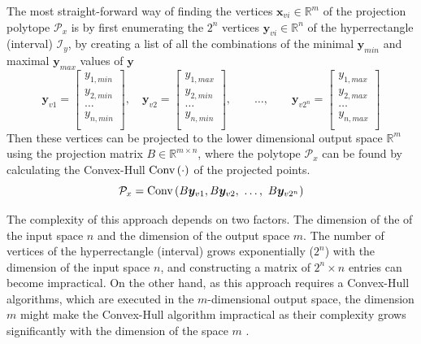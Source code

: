The most straight-forward way of finding the vertices $\bm{x}_{vi}\in\mathbb{R}^m$ of the projection polytope $\mathcal{P}_x$ is by first enumerating the $2^n$ vertices $\bm{y}_{vi}\in\mathbb{R}^n$ of the hyperrectangle  (interval) $\mathcal{I}_y$, by creating a list of all the combinations of the minimal $\bm{y}_{min}$ and maximal $\bm{y}_{max}$ values of $\bm{y}$
\begin{equation}
    \bm{y}_{v1} = \begin{bmatrix}
        y_{1,min}\\
        y_{2,min}\\
        \ldots\\
        y_{n,min}\\
    \end{bmatrix},\quad
    \bm{y}_{v2} = \begin{bmatrix}
        y_{1,max}\\
        y_{2,min}\\
        \ldots\\
        y_{n,min}\\
    \end{bmatrix},\qquad\ldots,\qquad
    \bm{y}_{v2^n} = \begin{bmatrix}
        y_{1,max}\\
        y_{2,max}\\
        \ldots\\
        y_{n,max}\\
    \end{bmatrix} 
\end{equation}
Then these vertices can be projected to the lower dimensional output space $\mathbb{R}^m$ using the projection matrix $B\in \mathbb{R}^{m\times n}$, where the polytope $\mathcal{P}_x$ can be found by calculating the Convex-Hull $\text{Conv}\left(\cdot\right)$ of the projected points.
\begin{equation}
    \mathcal{P}_x = \text{Conv}\left(B\bm{y}_{v1},B\bm{y}_{v2},~\ldots, ~ B\bm{y}_{v2^n}\right)
\end{equation}

The complexity of this approach depends on two factors. The dimension of the of the input space $n$ and the dimension of the output space $m$. The number of vertices of the hyperrectangle (interval) grows exponentially ($2^n$) with the dimension of the input space $n$, and constructing a matrix of $2^n \times n$ entries can become impractical. On the other hand, as this approach requires a Convex-Hull algorithms, which are executed in the $m$-dimensional output space, the dimension $m$ might make the Convex-Hull algorithm impractical as their complexity grows significantly with the dimension of the space $m$ \cite{Barber1996}.

